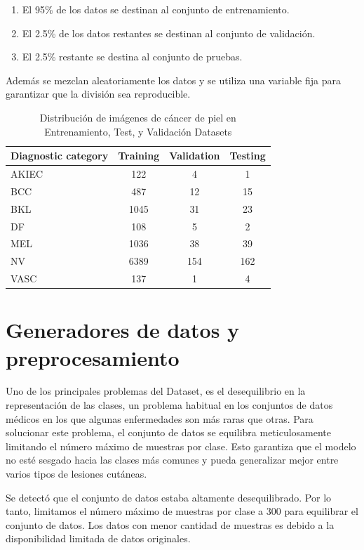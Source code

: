 \begin{enumerate}
   \item El 95\% de los datos se destinan al conjunto de entrenamiento.
   \item El 2.5\% de los datos restantes se destinan al conjunto de validación.
   \item El 2.5\% restante se destina al conjunto de pruebas.
\end{enumerate}
 
Además se mezclan aleatoriamente los datos y se utiliza una variable fija para garantizar que la división sea reproducible.

\begin{table}[h]
   \centering
   \begin{tabular}{lccc}
   \hline
   Diagnostic category & Training & Validation & Testing \\ \hline
   AKIEC & 122 & 4 & 1 \\
   BCC & 487 & 12 & 15 \\
   BKL & 1045 & 31 & 23 \\
   DF & 108 & 5 & 2 \\
   MEL & 1036 & 38 & 39 \\
   NV & 6389 & 154 & 162 \\
   VASC & 137 & 1 & 4 \\ \hline
   \end{tabular}
   \caption{Distribución de imágenes de cáncer de piel en Entrenamiento, Test, y Validación Datasets}
   \label{tab:train_test_validate}
   \end{table}

\section{Generadores de datos y preprocesamiento}

Uno de los principales problemas del Dataset, es el desequilibrio en la representación de las clases, un problema habitual en los conjuntos de datos médicos en los que algunas enfermedades son más raras que otras. Para solucionar este problema, el conjunto de datos se equilibra meticulosamente limitando el número máximo de muestras por clase. Esto garantiza que el modelo no esté sesgado hacia las clases más comunes y pueda generalizar mejor entre varios tipos de lesiones cutáneas.

Se detectó que el conjunto de datos estaba altamente desequilibrado. Por lo tanto, limitamos el número máximo de muestras por clase a 300 para equilibrar el conjunto de datos. Los datos con menor cantidad de muestras es debido a la disponibilidad limitada de datos originales. \\ 

